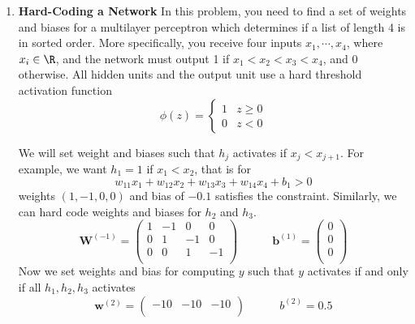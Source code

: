 \documentclass[11pt]{article}
\begin{document}
\newcommand{\calE}{\mathcal{E}}
\newcommand{\calR}{\mathcal{R}}
\newcommand{\calS}{\mathcal{S}}
\newcommand{\calL}{\mathcal{L}}
\newcommand{\lebpar}[2]{\frac{\partial #1}{\partial #2}}

\begin{enumerate}
\item \textbf{Hard-Coding a Network} In this problem, you need to find a set of weights and biases for a multilayer perceptron which determines if a list of length 4 is in sorted order. More specifically, you receive four inputs $x_1,\cdots,x_4$, where $x_i\in \R$, and the network must output 1 if $x_1 < x_2 < x_3 < x_4$, and 0 otherwise. All hidden units and the output unit use a hard threshold activation function
\[
    \phi(z) = 
    \begin{cases}
        1 & z \geq 0 \\ 
        0 & z < 0
    \end{cases}    
\]
\begin{solution}
    We will set weight and biases such that $h_j$ activates if $x_j < x_{j+1}$. For example, we want $h_1 = 1$ if $x_1 < x_2$, that is for
    \[
        w_{11} x_1 + w_{12} x_2 + w_{13} x_3 + w_{14} x_4 + b_1> 0
    \]
    weights $(1, -1, 0, 0)$ and bias of $-0.1$ satisfies the constraint. Similarly, we can hard code weights and biases for $h_2$ and $h_3$. 
    \[
        \mathbf{W}^{(-1)} = 
        \begin{pmatrix}
            1 & -1 & 0 & 0 \\
            0 & 1 & -1 & 0 \\
            0 & 0 & 1 & -1 \\ 
        \end{pmatrix} 
        \quad \quad \quad 
        \mathbf{b}^{(1)} = 
        \begin{pmatrix}
            0\\ 0 \\ 0 \\
        \end{pmatrix}
    \]
    Now we set weights and bias for computing $y$ such that $y$ activates if and only if all $h_1,h_2,h_3$ activates 
    \[
        \mathbf{w}^{(2)} = 
        \begin{pmatrix}
            -10 & -10 & -10 \\ 
        \end{pmatrix}
        \quad \quad \quad 
        b^{(2)} = 0.5
    \]

\end{solution}


\end{enumerate}
\end{document}
